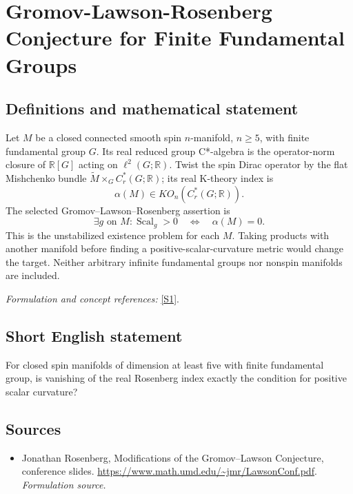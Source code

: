 \documentclass[11pt]{article}
\begin{document}
\section*{\texorpdfstring{Gromov-Lawson-Rosenberg Conjecture for Finite Fundamental Groups}{Gromov-Lawson-Rosenberg Conjecture for Finite Fundamental Groups}}\label{400}
\subsection{Definitions and mathematical statement}
Let $M$ be a closed connected smooth spin $n$-manifold, $n\ge5$, with finite fundamental group $G$. Its real reduced group C*-algebra is the operator-norm closure of ${\mathbb{R}}[G]$ acting on $\ell^2(G;{\mathbb{R}})$. Twist the spin Dirac operator by the flat Mishchenko bundle $\widetilde M\times_G C_r^*(G;{\mathbb{R}})$; its real K-theory index is
\[
 \alpha(M)\in KO_n(C_r^*(G;{\mathbb{R}})).
\]
The selected Gromov--Lawson--Rosenberg assertion is
\[
 \exists g\text{ on }M:\operatorname{Scal}_g>0
 \quad\Longleftrightarrow\quad\alpha(M)=0.
\]
This is the unstabilized existence problem for each $M$. Taking products with another manifold before finding a positive-scalar-curvature metric would change the target. Neither arbitrary infinite fundamental groups nor nonspin manifolds are included.
\par\smallskip\textit{Formulation and concept references:} \href{https://www.math.umd.edu/~jmr/LawsonConf.pdf}{[S1]}.

\subsection{Short English statement}
For closed spin manifolds of dimension at least five with finite fundamental group, is vanishing of the real Rosenberg index exactly the condition for positive scalar curvature?
\subsection{Sources}
\begin{itemize}
\item[S1]Jonathan Rosenberg, Modifications of the Gromov–Lawson Conjecture, conference slides.
\url{https://www.math.umd.edu/~jmr/LawsonConf.pdf}.
\textit{Formulation source.}
\end{itemize}
\end{document}
